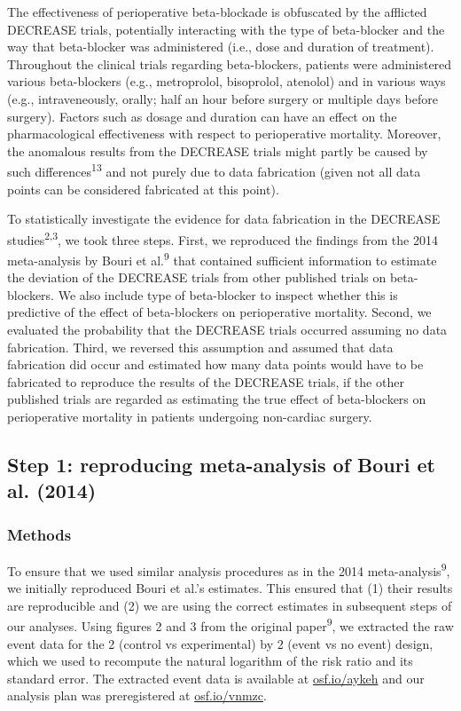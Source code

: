 \documentclass[]{article}
\begin{document}
The effectiveness of perioperative beta-blockade is obfuscated by the
afflicted DECREASE trials, potentially interacting with the type of
beta-blocker and the way that beta-blocker was administered (i.e., dose
and duration of treatment). Throughout the clinical trials regarding
beta-blockers, patients were administered various beta-blockers (e.g.,
metroprolol, bisoprolol, atenolol) and in various ways (e.g.,
intraveneously, orally; half an hour before surgery or multiple days
before surgery). Factors such as dosage and duration can have an effect
on the pharmacological effectiveness with respect to perioperative
mortality. Moreover, the anomalous results from the DECREASE trials
might partly be caused by such differences\textsuperscript{13} and not
purely due to data fabrication (given not all data points can be
considered fabricated at this point).

To statistically investigate the evidence for data fabrication in the
DECREASE studies\textsuperscript{2,3}, we took three steps. First, we
reproduced the findings from the 2014 meta-analysis by Bouri et
al.\textsuperscript{9} that contained sufficient information to estimate
the deviation of the DECREASE trials from other published trials on
beta-blockers. We also include type of beta-blocker to inspect whether
this is predictive of the effect of beta-blockers on perioperative
mortality. Second, we evaluated the probability that the DECREASE trials
occurred assuming no data fabrication. Third, we reversed this
assumption and assumed that data fabrication did occur and estimated how
many data points would have to be fabricated to reproduce the results of
the DECREASE trials, if the other published trials are regarded as
estimating the true effect of beta-blockers on perioperative mortality
in patients undergoing non-cardiac surgery.

\subsection{Step 1: reproducing meta-analysis of Bouri et al.
(2014)}\label{step-1-reproducing-meta-analysis-of-bouri-et-al.-2014}

\subsubsection{Methods}\label{methods}

To ensure that we used similar analysis procedures as in the 2014
meta-analysis\textsuperscript{9}, we initially reproduced Bouri et al.'s
estimates. This ensured that (1) their results are reproducible and (2)
we are using the correct estimates in subsequent steps of our analyses.
Using figures 2 and 3 from the original paper\textsuperscript{9}, we
extracted the raw event data for the 2 (control vs experimental) by 2
(event vs no event) design, which we used to recompute the natural
logarithm of the risk ratio and its standard error. The extracted event
data is available at \href{https://osf.io/aykeh}{osf.io/aykeh} and our
analysis plan was preregistered at
\href{https://osf.io/vnmzc}{osf.io/vnmzc}.
\end{document}
